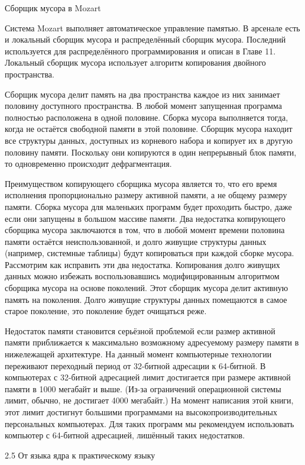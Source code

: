 Сборщик мусора в Mozart

Система Mozart выполняет автоматическое управление памятью. В арсенале есть и локальный сборщик мусора и распределённый сборщик мусора. Последний используется для распределённого программирования и описан в Главе 11. Локальный сборщик мусора использует алгоритм копирования двойного пространства.

Сборщик мусора делит память на два пространства каждое из них занимает половину доступного пространства. В любой момент запущенная программа полностью расположена в одной половине. Сборка мусора выполняется тогда, когда не остаётся свободной памяти в этой половине. Сборщик мусора находит все структуры данных, доступных из корневого набора и копирует их в другую половину памяти. Поскольку они копируются в один непрерывный блок памяти, то одновременно происходит дефрагментация.

Преимуществом копирующего сборщика мусора является то, что его время исполнения пропорционально размеру активной памяти, а не общему размеру памяти. Сборка мусора для маленьких программ будет проходить быстро, даже если они запущены в большом массиве памяти. Два недостатка копирующего сборщика мусора заключаются в том, что в любой момент времени половина памяти остаётся неиспользованной, и долго живущие структуры данных (например, системные таблицы) будут копироваться при каждой сборке мусора. Рассмотрим как исправить эти два недостатка. Копирования долго живущих данных можно избежать воспользовавшись модифицированным алгоритмом сборщика мусора на основе поколений. Этот сборщик мусора делит активную память на поколения. Долго живущие структуры данных помещаются в самое старое поколение, это поколение будет очищаться реже.

Недостаток памяти становится серьёзной проблемой если размер активной памяти приближается к максимально возможному адресуемому размеру памяти в нижележащей архитектуре. На данный момент компьютерные технологии переживают переходный период от 32-битной адресации к 64-битной. В компьютерах с 32-битной адресацией лимит достигается при размере активной памяти в 1000 мегабайт и выше. (Из-за ограничений операционной системы лимит, обычно, не достигает 4000 мегабайт.) На момент написания этой книги, этот лимит достигнут большими программами на высокопроизводительных персональных компьютерах. Для таких программ мы рекомендуем использовать компьютер с 64-битной адресацией, лишённый таких недостатков.

2.5 От языка ядра к практическому языку

